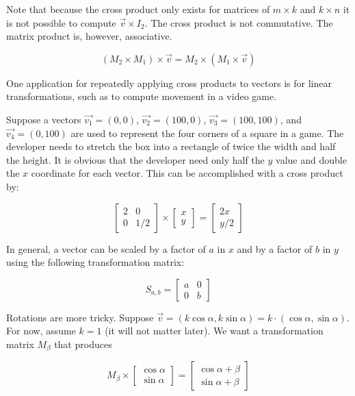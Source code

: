 \documentclass{book}
\begin{document}
Note that because the cross product only exists for matrices of $m \times k$ and $k \times n$ it is not possible to compute $\vec{v} \times I_2$. The cross product is not commutative. The matrix product is, however, associative.

\begin{equation}\label{associative}
(M_2 \times M_1) \times \vec{v} = M_2 \times (M_1 \times \vec{v})
\end{equation}

One application for repeatedly applying cross products to vectors is for linear transformations, such as to compute movement in a video game.

Suppose a vectors $\vec{v_1}=(0,0)$, $\vec{v_2}=(100,0)$, $\vec{v_3}=(100,100)$, and $\vec{v_4}=(0,100)$ are used to represent the four corners of a square in a game. The developer needs to stretch the box into a rectangle of twice the width and half the height. It is obvious that the developer need only half the $y$ value and double the $x$ coordinate for each vector. This can be accomplished with a cross product by:

\begin{equation*}\begin{bmatrix}2 & 0 \\ 0 & 1/2\end{bmatrix} \times \begin{bmatrix}x \\ y\end{bmatrix} = \begin{bmatrix}2x \\ y/2\end{bmatrix}\end{equation*}

In general, a vector can be scaled by a factor of $a$ in $x$ and by a factor of $b$ in $y$ using the following transformation matrix:

\begin{equation}\label{scale}
S_{a,b}=\begin{bmatrix}a & 0 \\ 0 & b\end{bmatrix}\end{equation}

Rotations are more tricky. Suppose $\vec{v} = (k \cos{\alpha}, k \sin{\alpha}) = k \cdot (\cos{\alpha}, \sin{\alpha})$. For now, assume $k=1$ (it will not matter later). We want a transformation matrix $M_{\beta}$ that produces

\begin{equation*}M_{\beta} \times \begin{bmatrix}\cos{\alpha} \\ \sin{\alpha}\end{bmatrix} = \begin{bmatrix}\cos{\alpha + \beta} \\ \sin{\alpha + \beta}\end{bmatrix}\end{equation*}
\end{document}
